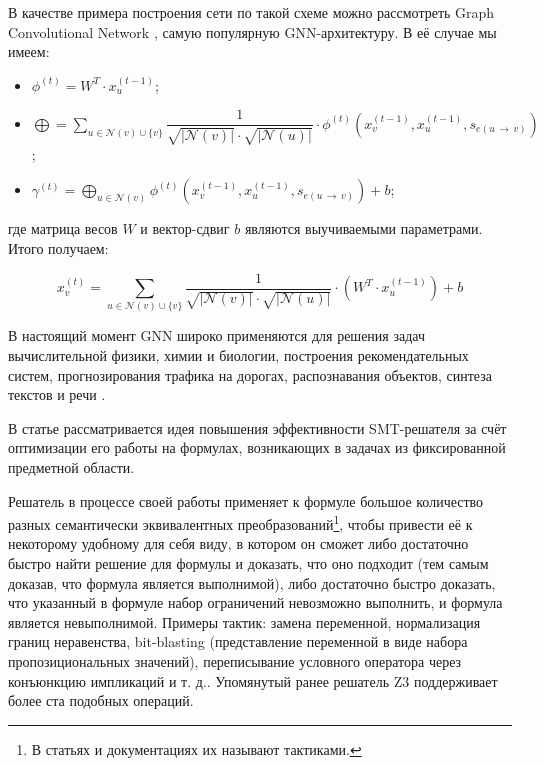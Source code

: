 В качестве примера построения сети по такой схеме можно рассмотреть Graph Convolutional Network \cite{gcn-conv-paper}, самую популярную GNN-архитектуру. В её случае мы имеем:

\begin{itemize}
    \item $\phi^{(t)} = W^T \cdot x_u^{(t - 1)}$;
    \item $\bigoplus = \sum \limits_{u \in \mathcal{N}(v) \cup \{v\}} \dfrac{1}{\sqrt{|\mathcal{N}(v)|} \cdot \sqrt{|\mathcal{N}(u)|}} \cdot \phi^{(t)} \left(x_v^{(t - 1)}, x_u^{(t - 1)}, s_{e(u \, \to \, v)} \right)$;
    \item $\gamma^{(t)} = \bigoplus \limits_{u \in \mathcal{N}(v)} \phi^{(t)} \left(x_v^{(t - 1)}, x_u^{(t - 1)}, s_{e(u \, \to \, v)} \right) + b$;
\end{itemize}

\noindent где матрица весов $W$ и вектор-сдвиг $b$ являются выучиваемыми параметрами. Итого получаем:

\begin{equation}
    x_v^{(t)} = \sum \limits_{u \in \mathcal{N}(v) \cup \{v\}} \dfrac{1}{\sqrt{|\mathcal{N}(v)|} \cdot \sqrt{|\mathcal{N}(u)|}} \cdot \left(W^T \cdot x_u^{(t - 1)} \right) + b
\end{equation}

В настоящий момент GNN широко применяются для решения задач вычислительной физики, химии и биологии, построения рекомендательных систем, прогнозирования трафика на дорогах, распознавания объектов, синтеза текстов и речи \cite{gnn-global-overview} \cite{gnn-deep-learning-5g}.



В статье \cite{fastsmt-paper} рассматривается идея повышения эффективности SMT-решателя за счёт оптимизации его работы на формулах, возникающих в задачах из фиксированной предметной области.

Решатель в процессе своей работы применяет к формуле большое количество разных семантически эквивалентных преобразований\footnote{В статьях и документациях их называют тактиками.}, чтобы привести её к некоторому удобному для себя виду, в котором он сможет либо достаточно быстро найти решение для формулы и доказать, что оно подходит (тем самым доказав, что формула является выполнимой), либо достаточно быстро доказать, что указанный в формуле набор ограничений невозможно выполнить, и формула является невыполнимой. Примеры тактик: замена переменной, нормализация границ неравенства, bit-blasting (представление переменной в виде набора пропозициональных значений), переписывание условного оператора через конъюнкцию импликаций и т. д.. Упомянутый ранее решатель Z3 \cite{z3-paper} поддерживает более ста подобных операций.

